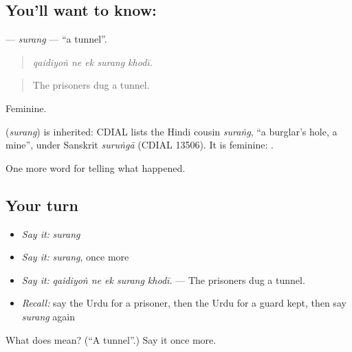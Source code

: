 \subsection*{You'll want to know: }
\textbf{} — \emph{surang} — \textquotedblleft{}a tunnel\textquotedblright{}.

\begin{quote}
    
\end{quote}

\begin{quote}
\emph{qaidiyoṅ ne ek surang khodī.}
\end{quote}

\begin{quote}
The prisoners dug a tunnel.
\end{quote}

Feminine.

\begin{cousinweb}
\textbf{} (\emph{surang}) is inherited: CDIAL lists the Hindi cousin \emph{suraṅg}, \textquotedblleft{}a burglar's hole, a mine\textquotedblright{}, under Sanskrit \emph{suruṅgā} (CDIAL 13506). It is feminine: \textbf{ }.
\end{cousinweb}

\begin{grammarlens}[title={What you've built}]
One more word for telling what happened.
\end{grammarlens}

\subsection*{Your turn}
\begin{itemize}
\raggedright
  \item \emph{Say it:} \emph{surang}
  \item \emph{Say it:} \emph{surang}, once more
  \item \emph{Say it:} \emph{qaidiyoṅ ne ek surang khodī.} — The prisoners dug a tunnel.
  \item \emph{Recall:} say the Urdu for a prisoner, then the Urdu for a guard kept, then say \emph{surang} again
\end{itemize}

\begin{tcolorbox}[breakable,colback=teal!4,colframe=teal!35!black,title={Before you move on}]
What does  mean? (\textquotedblleft{}A tunnel\textquotedblright{}.) Say it once more.
\end{tcolorbox}
